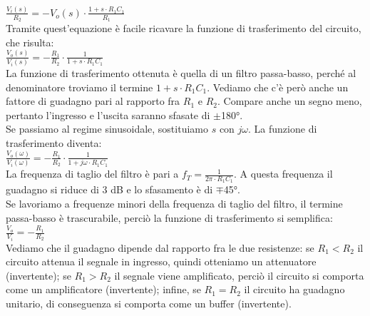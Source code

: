 \documentclass{report}
\begin{document}
\\[2pt]\indent $\displaystyle{\frac{V_i(s)}{R_2}=-V_o(s)\cdot\frac{1+s\cdot R_1C_1}{R_1}}$
\\[2pt]Tramite quest'equazione è facile ricavare la funzione di trasferimento del circuito, che risulta:
\\[2pt]\indent $\displaystyle{\frac{V_o(s)}{V_i(s)}=-\frac{R_1}{R_2}\cdot\frac{1}{1+s\cdot R_1C_1}}$
\\[2pt]La funzione di trasferimento ottenuta è quella di un filtro passa-basso, perché al denominatore troviamo il termine $1+s\cdot R_1C_1$. Vediamo che c'è però anche un fattore di guadagno pari al rapporto fra $R_1$ e $R_2$. Compare anche un segno meno, pertanto l'ingresso e l'uscita saranno sfasate di $\displaystyle\pm$180°.
\\Se passiamo al regime sinusoidale, sostituiamo $s$ con $j\omega$. La funzione di trasferimento diventa:
\\[2pt]\indent $\displaystyle{\frac{V_o(\omega)}{V_i(\omega)}=-\frac{R_1}{R_2}\cdot\frac{1}{1+j\omega\cdot R_1C_1}}$
\\[2pt]La frequenza di taglio del filtro è pari a $\displaystyle{f_T=\frac{1}{2\pi\cdot R_1C_1}}$. A questa frequenza il guadagno si riduce di 3 dB e lo sfasamento è di $\mp$45°.
\\[2pt]Se lavoriamo a frequenze minori della frequenza di taglio del filtro, il termine passa-basso è trascurabile, perciò la funzione di trasferimento si semplifica:
\\[2pt]\indent$\displaystyle{\frac{V_o}{V_i}=-\frac{R_1}{R_2}}$
\\[2pt]Vediamo che il guadagno dipende dal rapporto fra le due resistenze: se $R_1<R_2$ il circuito attenua il segnale in ingresso, quindi otteniamo un attenuatore (invertente); se $R_1>R_2$ il segnale viene amplificato, perciò il circuito si comporta come un amplificatore (invertente); infine, se $R_1=R_2$ il circuito ha guadagno unitario, di conseguenza si comporta come un buffer (invertente). 
\end{document}
